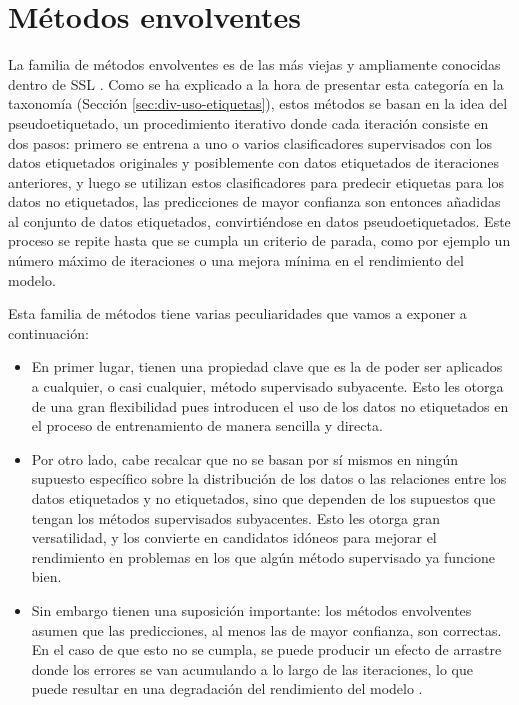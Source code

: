 \chapter{Métodos envolventes}
\label{cap:envolventes}

La familia de métodos envolventes es de las más viejas y ampliamente conocidas dentro de \gls{SSL} \cite{zhou2010semi}. Como se ha explicado a la hora de presentar esta categoría en la taxonomía (Sección \ref{sec:div-uso-etiquetas}), estos métodos se basan en la idea del pseudoetiquetado, un procedimiento iterativo donde cada iteración consiste en dos pasos: primero se entrena a uno o varios clasificadores supervisados con los datos etiquetados originales y posiblemente con datos etiquetados de iteraciones anteriores, y luego se utilizan estos clasificadores para predecir etiquetas para los datos no etiquetados, las predicciones de mayor confianza son entonces añadidas al conjunto de datos etiquetados, convirtiéndose en datos pseudoetiquetados. Este proceso se repite hasta que se cumpla un criterio de parada, como por ejemplo un número máximo de iteraciones o una mejora mínima en el rendimiento del modelo.

Esta familia de métodos tiene varias peculiaridades que vamos a exponer a continuación:

\begin{itemize}
    \item En primer lugar, tienen una propiedad clave que es la de poder ser aplicados a cualquier, o casi cualquier, método supervisado subyacente. Esto les otorga de una gran flexibilidad pues introducen el uso de los datos no etiquetados en el proceso de entrenamiento de manera sencilla y directa. 
    \item Por otro lado, cabe recalcar que no se basan por sí mismos en ningún supuesto específico sobre la distribución de los datos o las relaciones entre los datos etiquetados y no etiquetados, sino que dependen de los supuestos que tengan los métodos supervisados subyacentes. Esto les otorga gran versatilidad, y los convierte en candidatos idóneos para mejorar el rendimiento en problemas en los que algún método supervisado ya funcione bien. 
    \item Sin embargo tienen una suposición importante: los métodos envolventes asumen que las predicciones, al menos las de mayor confianza, son correctas. En el caso de que esto no se cumpla, se puede producir un efecto de arrastre donde los errores se van acumulando a lo largo de las iteraciones, lo que puede resultar en una degradación del rendimiento del modelo \cite{zhu2009introduction}.
\end{itemize}

